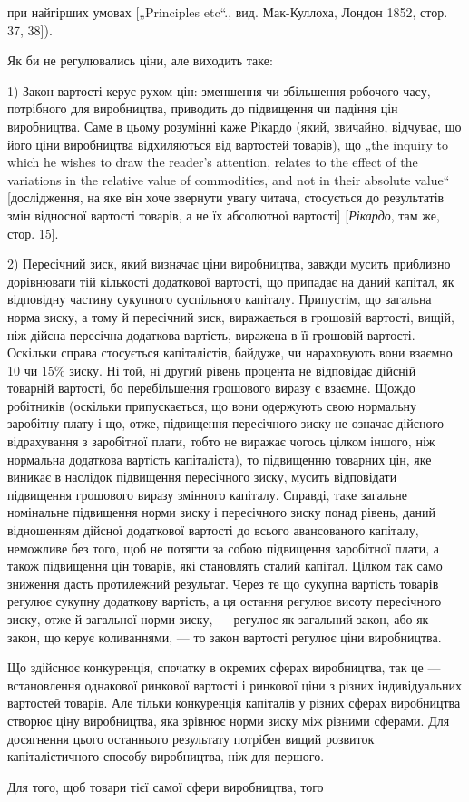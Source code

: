 \parcont{}  %
при найгірших умовах [„Principles etc“., вид. Мак-Куллоха, Лондон
1852, стор. 37, 38]).

Як би не регулювались ціни, але виходить таке:

1) Закон вартості керує рухом цін: зменшення чи збільшення
робочого часу, потрібного для виробництва, приводить до підвищення
чи падіння цін виробництва. Саме в цьому розумінні
каже Рікардо (який, звичайно, відчуває, що його ціни виробництва
відхиляються від вартостей товарів), що „the inquiry to
which he wishes to draw the reader’s attention, relates to the effect
of the variations in the relative value of commodities, and not in
their absolute value“ [дослідження, на яке він хоче звернути увагу
читача, стосується до результатів змін відносної вартості товарів,
а не їх абсолютної вартості] [\emph{Рікардо}, там же, стор. 15].

2) Пересічний зиск, який визначає ціни виробництва, завжди
мусить приблизно дорівнювати тій кількості додаткової вартості,
що припадає на даний капітал, як відповідну частину сукупного
суспільного капіталу. Припустім, що загальна норма
зиску, а тому й пересічний зиск, виражається в грошовій вартості,
вищій, ніж дійсна пересічна додаткова вартість, виражена в її
грошовій вартості. Оскільки справа стосується капіталістів, байдуже,
чи нараховують вони взаємно 10 чи 15\% зиску. Ні той,
ні другий рівень процента не відповідає дійсній товарній вартості,
бо перебільшення грошового виразу є взаємне. Щождо
робітників (оскільки припускається, що вони одержують свою
нормальну заробітну плату і що, отже, підвищення пересічного
зиску не означає дійсного відрахування з заробітної плати,
тобто не виражає чогось цілком іншого, ніж нормальна додаткова
вартість капіталіста), то підвищенню товарних цін, яке
виникає в наслідок підвищення пересічного зиску, мусить відповідати
підвищення грошового виразу змінного капіталу. Справді,
таке загальне номінальне підвищення норми зиску і пересічного
зиску понад рівень, даний відношенням дійсної додаткової
вартості до всього авансованого капіталу, неможливе без того,
щоб не потягти за собою підвищення заробітної плати, а також
підвищення цін товарів, які становлять сталий капітал. Цілком
так само зниження дасть протилежний результат. Через те що
сукупна вартість товарів регулює сукупну додаткову вартість,
а ця остання регулює висоту пересічного зиску, отже й загальної
норми зиску, — регулює як загальний закон, або як закон, що
керує коливаннями, — то закон вартості регулює ціни виробництва.

Що здійснює конкуренція, спочатку в окремих сферах виробництва,
так це — встановлення однакової ринкової вартості
і ринкової ціни з різних індивідуальних вартостей товарів. Але
тільки конкуренція капіталів у різних сферах виробництва створює
ціну виробництва, яка зрівнює норми зиску між різними сферами.
Для досягнення цього останнього результату потрібен вищий
розвиток капіталістичного способу виробництва, ніж для першого.

Для того, щоб товари тієї самої сфери виробництва, того
\parbreak{}  %
